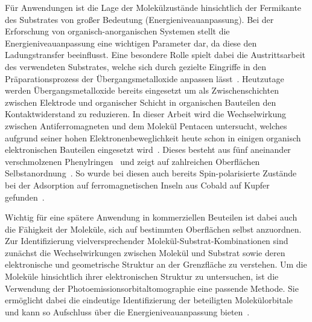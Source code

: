     Für Anwendungen ist die Lage der Molekülzustände hinsichtlich der Fermikante des Substrates von großer Bedeutung (Energieniveauanpassung).
    Bei der Erforschung von organisch-anorganischen Systemen stellt die Energieniveauanpassung eine wichtigen Parameter dar, da diese den Ladungstransfer beeinflusst.
    Eine besondere Rolle spielt dabei die Austrittsarbeit des verwendeten Substrates, welche sich durch gezielte Eingriffe in den Präparationsprozess der Übergangsmetalloxide anpassen lässt~\cite{5A_4, 5A_3, IF_11}.
    Heutzutage werden Übergangsmetalloxide bereits eingesetzt um als Zwischenschichten zwischen Elektrode und organischer Schicht in organischen Bauteilen den Kontaktwiderstand zu reduzieren.
    In dieser Arbeit wird die Wechselwirkung zwischen Antiferromagneten und dem Molekül Pentacen untersucht, welches aufgrund seiner hohen Elektronenbeweglichkeit heute schon in einigen organisch elektronischen Bauteilen eingesetzt wird~\cite{5A_4, 5A_13}.
    Dieses besteht aus fünf aneinander verschmolzenen Phenylringen~\cite{MM_2} und zeigt auf zahlreichen Oberflächen Selbstanordnung~\cite{5A_4, 5A_1, 5A_6, 5A_10, 5A_5, 5A_9}.
    So wurde bei diesen auch bereits Spin-polarisierte Zustände bei der Adsorption auf ferromagnetischen Inseln aus Cobald auf Kupfer gefunden~\cite{chu_spin-dependent_2015}.

    Wichtig für eine spätere Anwendung in kommerziellen Beuteilen ist dabei auch die Fähigkeit der Moleküle, sich auf bestimmten Oberflächen selbst anzuordnen.
    Zur Identifizierung vielversprechender Molekül-Substrat-Kombinationen sind zunächst die Wechselwirkungen zwischen Molekül und Substrat sowie deren elektronische und geometrische Struktur an der Grenzfläche zu verstehen.
    Um die Moleküle hinsichtlich ihrer elektronischen Struktur zu untersuchen, ist die Verwendung der Photoemissionsorbitaltomographie eine passende Methode.
    Sie ermöglicht dabei die eindeutige Identifizierung der beteiligten Molekülorbitale und kann so Aufschluss über die Energieniveauanpassung bieten~\cite{MM_2, MM_5}. %


